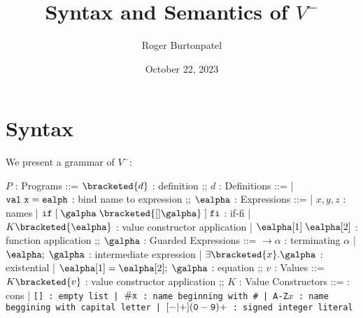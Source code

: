 \documentclass[]{article}
\title{Syntax and Semantics of $V^{-}$}
\author{Roger Burtonpatel}
\date{October 22, 2023}
\begin{document}
\maketitle

\section{Syntax}

We present a grammar of $V^{-}$: 

\bigskip



\begin{center}
    \begin{bnf}
    $P$ : \textsf{Programs} ::=
    $\bracketed{d}$ : definition
    ;;
    $d$ : \textsf{Definitions} ::=
    | $\tt{val} \; x \; \tt{=} \; ealph$ : bind name to expression
    ;;
    $\ealpha$ : \textsf{Expressions} ::=
    | $x, y, z$ : names
    | $\tt{if} \; \tt{[}\; \galpha \; \bracketed{[] \galpha} \;\tt{]} \; \tt{fi}$ : if-fi 
    | $K \bracketed{\ealpha}$ : value constructor application 
    | $\ealpha[1] \; \ealpha[2]$ : function application 
    ;;
    $\galpha$ : \textsf{Guarded Expressions} ::=  
    $\boldsymbol{\rightarrow}\alpha$ : terminating $\alpha$ 
    | $\ealpha; \; \galpha$ : intermediate expression 
    | $\exists \bracketed{x} \tt{.} \galpha$ : existential 
    | $\ealpha[1] = \ealpha[2]; \; \galpha$ : equation 
    ;;
    $v$ : Values ::= $K\bracketed{v}$ : value constructor application 
    ;;
    $K$ : \textsf{Value Constructors} ::=
    \cons : cons 
    | \tt{[]} : empty list 
    | $\tt{\#}x$ : name beginning with \tt{\#}
    | \tt{A-Z}$x$ : name beggining with capital letter
    | $[\tt{-}\vert\tt{+}](\tt{0}-\tt{9})+$ : signed integer literal 

    \end{bnf}
\end{center}
\end{document}
